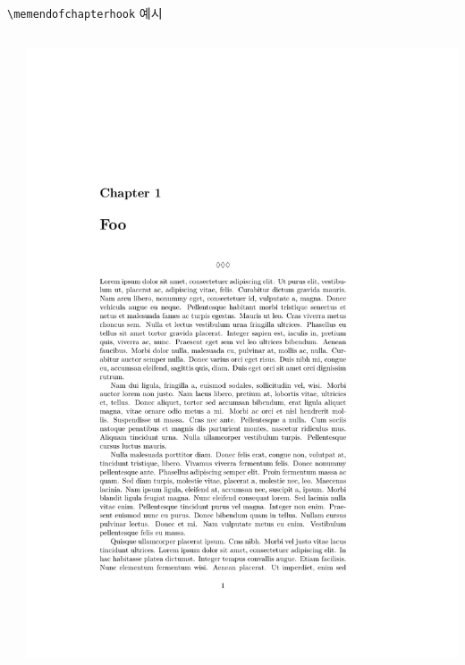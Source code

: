 \documentclass{beamer}
\def\tbs{\textbackslash}
\begin{document}
\begin{frame}[fragile]{\texttt{\tbs memendofchapterhook} 예시}
  \begin{columns}
    \begin{column}{0.6\textwidth}
      \begin{latexcode}
        \renewcommand*{\clearforchapter}{}
        \renewcommand{\memendofchapterhook}{%
          \begin{center}
            $\lozenge\lozenge\lozenge$
          \end{center}}
      \end{latexcode}
    \end{column}

    \begin{column}{0.4\textwidth}
      \includegraphics[frame,page=1,width=\linewidth]{memendofchapterhook}
    \end{column}
  \end{columns}
\end{frame}
\end{document}
